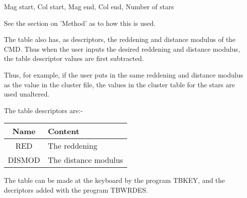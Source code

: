 {{{\begin{list}{{-}}{}
      Mag start, Col start, Mag end, Col end, Number of stars
                                                                               
                                                                               
\item See the section on 'Method' as to how this is used.
                                                                               
                                                                               
\item The table also has, as descriptors, the reddening and distance modulus
      of the CMD. Thus when the user inputs the desired reddening and
      distance modulus, the table descriptor values are first subtracted.
                                                                               
      Thus, for example, if the user puts in the same reddening and distance
      modulus as the value in the cluster file, the values in the cluster
      table for the stars are used unaltered.
                                                                               
      The table descriptors are:-

\begin{tabular}{|c|l|}\hline                                                                               
      Name   &  Content \\ \hline
      RED    &  The reddening \\
      DISMOD &  The distance modulus \\ \hline
\end{tabular}                                                                               
                                                                               
\item The table can be made at the keyboard by the program TBKEY, and the
      decriptors added with the program TBWRDES.
\end{list}                                                                               
                                                                               
}}}
